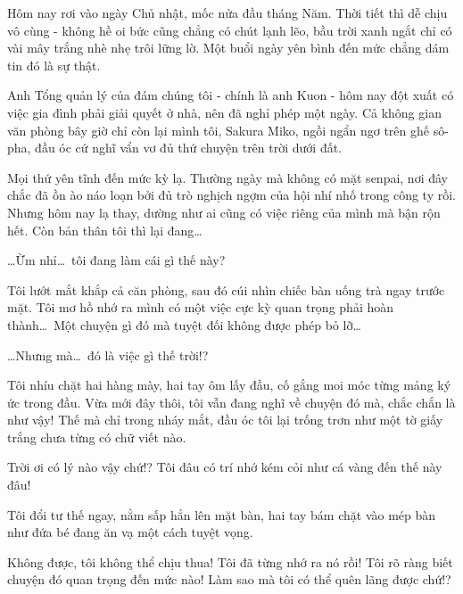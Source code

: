 \documentclass[../main.tex]{subfiles}
\begin{document}


Hôm nay rơi vào ngày Chủ nhật, mốc nửa đầu tháng Năm. Thời tiết thì dễ chịu vô cùng - không hề oi bức cũng chẳng có chút lạnh lẽo, bầu trời xanh ngắt chỉ có vài mây trắng nhè nhẹ trôi lững lờ. Một buổi ngày yên bình đến mức chẳng dám tin đó là sự thật.

Anh Tổng quản lý của đám chúng tôi - chính là anh Kuon - hôm nay đột xuất có việc gia đình phải giải quyết ở nhà, nên đã nghỉ phép một ngày. Cả không gian văn phòng bây giờ chỉ còn lại mình tôi, Sakura Miko, ngồi ngẩn ngơ trên ghế sô-pha, đầu óc cứ nghĩ vẩn vơ đủ thứ chuyện trên trời dưới đất.

Mọi thứ yên tĩnh đến mức kỳ lạ. Thường ngày mà không có mặt senpai, nơi đây chắc đã ồn ào náo loạn bởi đủ trò nghịch ngợm của hội nhí nhố trong công ty rồi. Nhưng hôm nay lạ thay, dường như ai cũng có việc riêng của mình mà bận rộn hết. Còn bản thân tôi thì lại đang\dots

\dots Ừm nhỉ\dots\ tôi đang làm cái gì thế này?

Tôi lướt mắt khắp cả căn phòng, sau đó cúi nhìn chiếc bàn uống trà ngay trước mặt. Tôi mơ hồ nhớ ra mình có một việc cực kỳ quan trọng phải hoàn thành\dots\ Một chuyện gì đó mà tuyệt đối không được phép bỏ lỡ\dots

\dots Nhưng mà\dots\ đó là việc gì thế trời!?

Tôi nhíu chặt hai hàng mày, hai tay ôm lấy đầu, cố gắng moi móc từng mảng ký ức trong đầu. Vừa mới đây thôi, tôi vẫn đang nghĩ về chuyện đó mà, chắc chắn là như vậy! Thế mà chỉ trong nháy mắt, đầu óc tôi lại trống trơn như một tờ giấy trắng chưa từng có chữ viết nào.

Trời ơi có lý nào vậy chứ!? Tôi đâu có trí nhớ kém cỏi như cá vàng đến thế này đâu!

Tôi đổi tư thế ngay, nằm sấp hẳn lên mặt bàn, hai tay bám chặt vào mép bàn như đứa bé đang ăn vạ một cách tuyệt vọng.

Không được, tôi không thể chịu thua! Tôi đã từng nhớ ra nó rồi! Tôi rõ ràng biết chuyện đó quan trọng đến mức nào! Làm sao mà tôi có thể quên lãng được chứ!?
\end{document}
